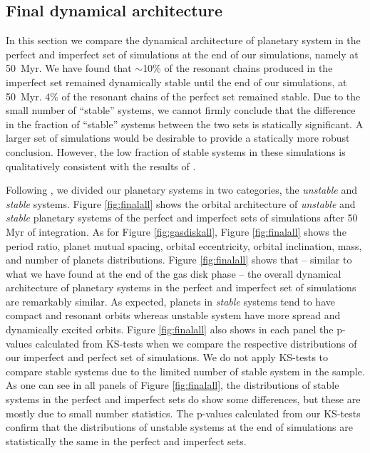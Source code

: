 \documentclass[fleqn,usenatbib]{mnras}
\begin{document}
\subsection{Final dynamical architecture}\label{subsec:longtermevolution}


In this section we compare the dynamical architecture of planetary system in the perfect and imperfect set of simulations at the end of our simulations, namely at 50~Myr. We have found that
$\sim$10\% of the resonant chains produced in the imperfect set remained dynamically stable until the end of our simulations, at 50~Myr. 4\% of the resonant chains of the perfect set remained stable. Due to the small number of ``stable'' systems, we cannot firmly conclude that the difference in the fraction of ``stable'' systems between the two sets is statically significant. A larger set of simulations would be desirable to provide a statically more robust conclusion.
However, the low fraction of stable systems in these simulations is qualitatively consistent with the results of \cite{izidoro2019formation}.




Following \cite{izidoro2017breaking,izidoro2019formation}, we divided our planetary systems in two categories, the {\it unstable} and {\it stable} systems. Figure \ref{fig:finalall} shows the orbital architecture of {\it unstable} and {\it stable} planetary systems of the perfect and imperfect sets of simulations after 50 Myr of integration. As for Figure \ref{fig:gasdiskall}, Figure \ref{fig:finalall} shows the period ratio, planet mutual spacing, orbital eccentricity, orbital inclination, mass, and number of planets distributions. Figure \ref{fig:finalall} shows that -- similar to what we have found at the end of the gas disk phase -- the overall dynamical architecture of planetary systems in the perfect and imperfect set of simulations are remarkably similar. As expected, planets in {\it stable} systems tend to have compact and resonant orbits whereas unstable system have more spread and dynamically excited orbits. Figure \ref{fig:finalall} also shows in each panel the p-values calculated from KS-tests when we compare the respective distributions of our imperfect and perfect set of simulations. We do not apply KS-tests to compare stable systems due to the limited number of stable system in the sample. As one can see in all panels of Figure \ref{fig:finalall}, the distributions of stable systems in the perfect and imperfect sets do show some differences, but these are mostly due to small number statistics. The p-values calculated from our KS-tests confirm that the distributions of unstable systems at the end of simulations are statistically the same in the perfect and imperfect sets.
\end{document}
